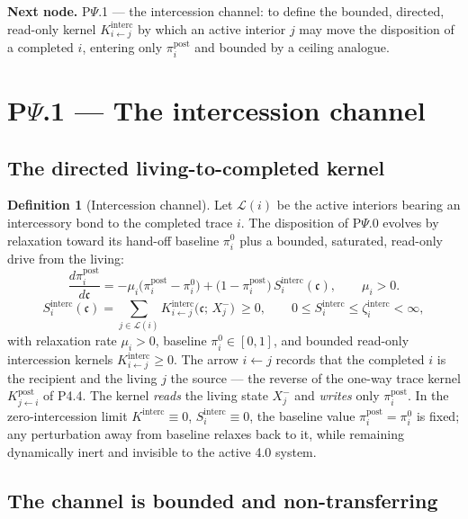 \documentclass[11pt,a4paper]{article}
\newcommand{\cint}{\ensuremath{\mathfrak c}}
\theoremstyle{definition}
\newtheorem{definition}{Definition}[section]
\theoremstyle{plain}
\theoremstyle{remark}
\begin{document}
\medskip
\textbf{Next node.} P$\Psi$.1 --- the intercession channel: to define the bounded, directed,
read-only kernel \(K^{\mathrm{interc}}_{i\leftarrow j}\) by which an active interior \(j\) may
move the disposition of a completed \(i\), entering only \(\pi_i^{\mathrm{post}}\) and bounded
by a ceiling analogue.

\section{P$\Psi$.1 --- The intercession channel}

\subsection{The directed living-to-completed kernel}

\begin{definition}[Intercession channel]\label{def:intercession}
Let \(\mathcal L(i)\) be the active interiors bearing an intercessory bond to the completed
trace \(i\). The disposition of P$\Psi$.0 evolves by relaxation toward its hand-off baseline
\(\pi_i^{0}\) plus a bounded, saturated, read-only drive from the living:
\[
\boxed{\;
\frac{d\pi_i^{\mathrm{post}}}{d\cint}
=
-\mu_i\bigl(\pi_i^{\mathrm{post}}-\pi_i^{0}\bigr)
+
\bigl(1-\pi_i^{\mathrm{post}}\bigr)\,S_i^{\mathrm{interc}}(\cint),
\qquad
\mu_i>0.
\;}
\]
\[
S_i^{\mathrm{interc}}(\cint)
=
\sum_{j\in\mathcal L(i)}
K^{\mathrm{interc}}_{i\leftarrow j}\bigl(\cint;\,X_j^{-}\bigr)\ \ge 0,
\qquad
0\le S_i^{\mathrm{interc}}\le \zeta_i^{\mathrm{interc}}<\infty,
\]
with relaxation rate \(\mu_i>0\), baseline \(\pi_i^{0}\in[0,1]\), and bounded read-only
intercession kernels \(K^{\mathrm{interc}}_{i\leftarrow j}\ge0\). The arrow \(i\leftarrow j\)
records that the completed \(i\) is the recipient and the living \(j\) the source --- the
reverse of the one-way trace kernel \(K^{\mathrm{post}}_{j\leftarrow i}\) of P4.4. The kernel
\emph{reads} the living state \(X_j^{-}\) and \emph{writes} only \(\pi_i^{\mathrm{post}}\).
In the zero-intercession limit \(K^{\mathrm{interc}}\equiv0\), \(S_i^{\mathrm{interc}}\equiv0\),
the baseline value \(\pi_i^{\mathrm{post}}=\pi_i^0\) is fixed; any perturbation away from
baseline relaxes back to it, while remaining dynamically inert and invisible to the active 4.0
system.
\end{definition}

\subsection{The channel is bounded and non-transferring}
\end{document}
